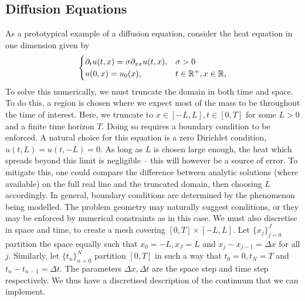     \subsection{Diffusion Equations}
    As a prototypical example of a diffusion equation, consider the heat equation in one dimension given by 
    \begin{equation}\begin{cases}
    \partial_t u(t,x) = \sigma\partial_{xx} u(t,x),&\sigma >0\\
    u(0,x) = u_0(x),  &t\in\mathbb{R}^+, x\in\mathbb{R},
    \end{cases}\label{eq:heat}\end{equation}
    To solve this numerically, we must truncate the domain in both time and space. To do this, a region is chosen where we expect most of the mass to be throughout the time of interest. Here, we truncate to \(x \in [-L,L], t \in [0,T]\) for some \(L>0\) and a finite time horizon \(T\). Doing so requires a boundary condition to be enforced. A natural choice for this equation is a zero Dirichlet condition, \(u(t,L) = u(t,-L) = 0\). As long as \(L\) is chosen large enough, the heat which spreads beyond this limit is negligible -- this will however be a source of error. To mitigate this, one could compare the difference between analytic solutions (where available) on the full real line and the truncated domain, then choosing $L$ accordingly. In general, boundary conditions are determined by the phenomenon being modelled. The problem geometry may naturally suggest conditions, or they may be enforced by numerical constraints as in this case. We must also discretise in space and time, to create a mesh covering \(\left[0,T\right] \times \left[-L,L\right]\). Let \(\lbrace x_j\rbrace_{j=0}^J\) partition the space equally such that \(x_0 = -L, x_J=L\) and \(x_j-x_{j-1} = \Delta x\) for all \(j\). Similarly, let \(\lbrace t_n\rbrace_{n=0}^N\) partition \(\left[0,T\right]\) in such a way that \(t_0=0, t_N =T\) and \(t_n-t_{n-1} = \Delta t\). The parameters \(\Delta x, \Delta t\) are the space step and time step respectively. We thus have a discretised description of the continuum that we can implement. 
    

